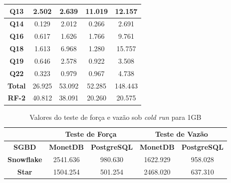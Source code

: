 \begin{table}[htpb]
\begin{tabular}{|c|c|c|c|c|}
         \textbf{Q13}         & 2.502             & 2.639                         & 11.019            & 12.157                    \\ 
        \hline
         \textbf{Q14}         & 0.129             & 2.012                         & 0.266             & 2.691                     \\ 
        \hline
         \textbf{Q16}         & 0.617             & 1.626                         & 1.766             & 9.761                     \\ 
        \hline
         \textbf{Q18}         & 1.613             & 6.968                         & 1.280             & 15.757                    \\ 
        \hline
         \textbf{Q19}         & 0.646             & 2.578                         & 0.922             & 3.508                     \\ 
        \hline
         \textbf{Q22}         & 0.323             & 0.979                         & 0.967             & 4.738                     \\ 
        \hline
         \textbf{Total}       & 26.925            & 53.092                        & 52.285            & 148.443                   \\ 
        \hline
         \textbf{RF-2}        & 40.812            & 38.091                        & 20.260            & 20.575                    \\
        \hline
        \end{tabular}
\end{table}

\begin{table}[htpb]
        \centering
        \caption{Valores do teste de força e vazão sob \textit{cold run} para 1GB}
        \label{tab:forca_vazao_cold_1}
        \begin{tabular}{|c|c|c|c|c|} 
        \cline{2-5}
        \multicolumn{1}{c|}{} & \multicolumn{2}{c|}{\textbf{Teste de Força} } & \multicolumn{2}{c|}{\textbf{Teste de Vazão} }  \\ 
        \hline
                \textbf{SGBD}        & \textbf{MonetDB}  & \textbf{PostgreSQL}       & \textbf{MonetDB}  & \textbf{PostgreSQL}        \\ 
        \hline
                \textbf{Snowflake}   & 2541.636          & 980.630                   & 1622.929          & 958.028                    \\ 
        \hline
                \textbf{Star}        & 1504.254          & 501.254                   & 2468.020          & 637.310                    \\
        \hline
        \end{tabular}
\end{table}

